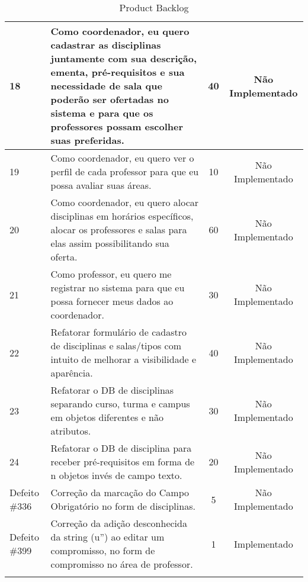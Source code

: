 \begin{landscape}
\begin{longtable}{|p{0.5in}|p{6in}|c|c|}
		\hline \rowcolor{cNaoImplementado}
		        18 & Como coordenador, eu quero cadastrar as disciplinas juntamente com sua descrição, ementa, pré-requisitos e sua necessidade de sala que poderão ser ofertadas no sistema e para que os professores possam escolher suas preferidas. &         40 & Não Implementado \\
		
		\hline \rowcolor{cNaoImplementado}
		        19 & Como coordenador, eu quero ver o perfil de cada professor para que eu possa avaliar suas áreas.  &         10 & Não Implementado \\
		
		\hline \rowcolor{cUserSprint}
		        20 & Como coordenador, eu quero alocar disciplinas em horários específicos, alocar os professores e salas para elas assim possibilitando sua oferta.  &         60 & Não Implementado \\
		
		\hline \rowcolor{cUserSprint}
		        21 & Como professor, eu quero me registrar no sistema para que eu possa fornecer meus dados ao coordenador. &         30 & Não Implementado \\
		
		\hline \rowcolor{cNaoImplementado}
		        22 & Refatorar formulário de cadastro de disciplinas e salas/tipos com intuito de melhorar a visibilidade e aparência.  &         40 & Não Implementado \\
		
		\hline \rowcolor{cNaoImplementado}
		        23 & Refatorar o DB de disciplinas separando curso, turma e campus em objetos diferentes e não atributos. &         30 & Não Implementado \\
		
		\hline \rowcolor{cNaoImplementado}
		        24 & Refatorar o DB de disciplina para receber pré-requisitos em forma de n objetos invés de campo texto. &         20 & Não Implementado \\
		
		\hline \rowcolor{cNaoImplementado}
				Defeito \#336 & Correção da marcação do Campo Obrigatório no form de disciplinas.  &          5 & Não Implementado \\
		
		\hline \rowcolor{cImplementado}
				Defeito \#399  & Correção da adição desconhecida da string (u'') ao editar um compromisso, no form de compromisso no área de professor. &          1 & Implementado \\
		
		\hline
		\caption{Product Backlog}
		\end{longtable}
		

\end{landscape}
